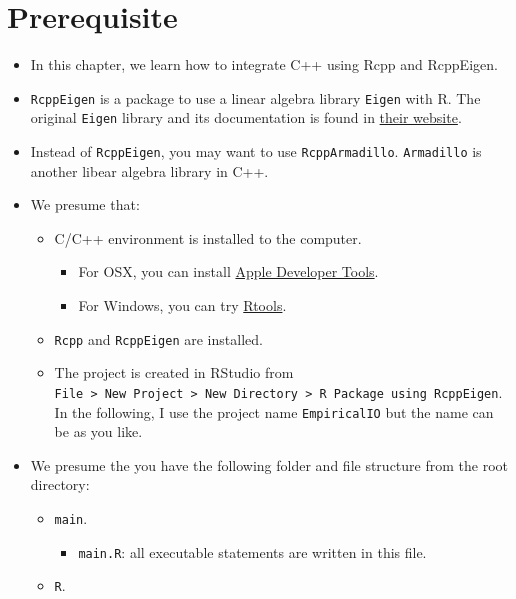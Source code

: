 \documentclass[
]{book}
\providecommand{\tightlist}{%
  \setlength{\itemsep}{0pt}\setlength{\parskip}{0pt}}
\begin{document}
\hypertarget{prerequisite}{%
\section{Prerequisite}\label{prerequisite}}

\begin{itemize}
\tightlist
\item
  In this chapter, we learn how to integrate C++ using Rcpp and RcppEigen.
\item
  \texttt{RcppEigen} is a package to use a linear algebra library \texttt{Eigen} with R. The original \texttt{Eigen} library and its documentation is found in \href{http://eigen.tuxfamily.org/index.php?title=Main_Page}{their website}.
\item
  Instead of \texttt{RcppEigen}, you may want to use \texttt{RcppArmadillo}. \texttt{Armadillo} is another libear algebra library in C++.
\item
  We presume that:

  \begin{itemize}
  \tightlist
  \item
    C/C++ environment is installed to the computer.

    \begin{itemize}
    \tightlist
    \item
      For OSX, you can install \href{https://developer.apple.com/xcode/}{Apple Developer Tools}.
    \item
      For Windows, you can try \href{https://cran.r-project.org/bin/windows/Rtools/}{Rtools}.
    \end{itemize}
  \item
    \texttt{Rcpp} and \texttt{RcppEigen} are installed.
  \item
    The project is created in RStudio from \texttt{File\ \textgreater{}\ New\ Project\ \textgreater{}\ New\ Directory\ \textgreater{}\ R\ Package\ using\ RcppEigen}. In the following, I use the project name \texttt{EmpiricalIO} but the name can be as you like.
  \end{itemize}
\item
  We presume the you have the following folder and file structure from the root directory:

  \begin{itemize}
  \tightlist
  \item
    \texttt{main}.

    \begin{itemize}
    \tightlist
    \item
      \texttt{main.R}: all executable statements are written in this file.
    \end{itemize}
  \item
    \texttt{R}.


\end{itemize}
\end{itemize}
\end{document}
